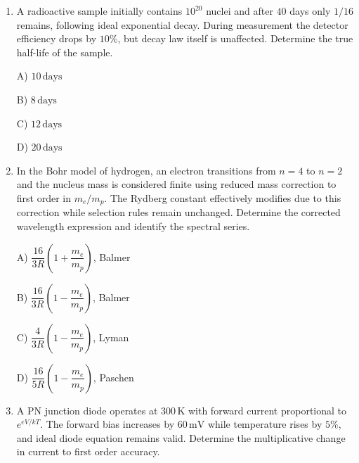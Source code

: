 \documentclass[12pt]{article}
\begin{document}
\begin{enumerate}[leftmargin=*]
A) Radius decreases by \(6\%\)  

B) Radius decreases by \(3\%\)  

C) Radius unchanged  

D) Radius increases by \(2\%\)  


\item A radioactive sample initially contains \(10^{20}\) nuclei and after \(40\) days only \(1/16\) remains, following ideal exponential decay. During measurement the detector efficiency drops by \(10\%\), but decay law itself is unaffected. Determine the true half-life of the sample.  

A) \(10\,\text{days}\)  

B) \(8\,\text{days}\)  

C) \(12\,\text{days}\)  

D) \(20\,\text{days}\)  


\item In the Bohr model of hydrogen, an electron transitions from \(n=4\) to \(n=2\) and the nucleus mass is considered finite using reduced mass correction to first order in \(m_e/m_p\). The Rydberg constant effectively modifies due to this correction while selection rules remain unchanged. Determine the corrected wavelength expression and identify the spectral series.  

\begin{center}
\end{center}

A) \(\dfrac{16}{3R}\left(1+\dfrac{m_e}{m_p}\right)\), Balmer  

B) \(\dfrac{16}{3R}\left(1-\dfrac{m_e}{m_p}\right)\), Balmer  

C) \(\dfrac{4}{3R}\left(1-\dfrac{m_e}{m_p}\right)\), Lyman  

D) \(\dfrac{16}{5R}\left(1-\dfrac{m_e}{m_p}\right)\), Paschen  


\item A PN junction diode operates at \(300\,\text{K}\) with forward current proportional to \(e^{eV/kT}\). The forward bias increases by \(60\,\text{mV}\) while temperature rises by \(5\%\), and ideal diode equation remains valid. Determine the multiplicative change in current to first order accuracy.  


\end{enumerate}
\end{document}
